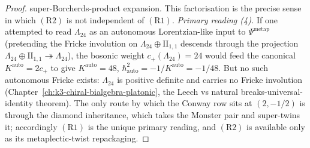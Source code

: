 \begin{proof}[Proof]
super-Borcherds-product expansion. This factorisation is the
precise sense in which $(\mathrm{R2})$ is not independent of
$(\mathrm{R1})$.
\emph{Primary reading (4).}
If one attempted to read $\Lambda_{24}$ as an autonomous
Lorentzian-like input to $\Psi^{\mathrm{metap}}$ (pretending the
Fricke involution on $\Lambda_{24}\oplus\mathrm{II}_{1,1}$
descends through the projection $\Lambda_{24}\oplus\mathrm{II}_{1,1}
\twoheadrightarrow\Lambda_{24}$), the bosonic weight
$c_+(\Lambda_{24}) = 24$ would feed the canonical
$K^{\mathrm{auto}} = 2c_+$ to give $K^{\mathrm{auto}} = 48$,
$\hbar^2_{\mathrm{auto}} = -1/K^{\mathrm{auto}} = -1/48$.
But no such autonomous Fricke exists: $\Lambda_{24}$ is positive
definite and carries no Fricke involution
(Chapter~\ref{ch:k3-chiral-bialgebra-platonic},
the Leech vs natural breaks-universal-identity theorem).
The only route by which the Conway row sits at $(2,-1/2)$ is
through the diamond inheritance, which takes the Monster pair
and super-twins it; accordingly $(\mathrm{R1})$ is the unique
primary reading, and $(\mathrm{R2})$ is available only as its
metaplectic-twist repackaging.


\end{proof}
